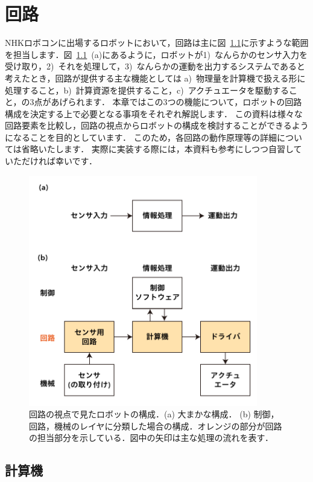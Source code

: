 \chapter{回路}

NHKロボコンに出場するロボットにおいて，回路は主に図~\ref{fig:circuit_overview}に示すような範囲を担当します．図~\ref{fig:circuit_overview}~(a)にあるように，ロボットが1)~なんらかのセンサ入力を受け取り，2)~それを処理して，3)~なんらかの運動を出力するシステムであると考えたとき，回路が提供する主な機能としては a)~物理量を計算機で扱える形に処理すること，b)~計算資源を提供すること，c)~アクチュエータを駆動すること，の3点があげられます．
本章ではこの3つの機能について，ロボットの回路構成を決定する上で必要となる事項をそれぞれ解説します．
この資料は様々な回路要素を比較し，回路の視点からロボットの構成を検討することができるようになることを目的としています．
このため，各回路の動作原理等の詳細については省略いたします．
実際に実装する際には，本資料も参考にしつつ自習していただければ幸いです．

\begin{figure}[h]
  \centering
  \includegraphics[width=10cm]{circuit/fig/1_circuit_overview.pdf}
  \caption{回路の視点で見たロボットの構成．(a) 大まかな構成． (b) 制御，回路，機械のレイヤに分類した場合の構成．オレンジの部分が回路の担当部分を示している．図中の矢印は主な処理の流れを表す．}
  \label{fig:circuit_overview}
\end{figure}


\section{計算機}


